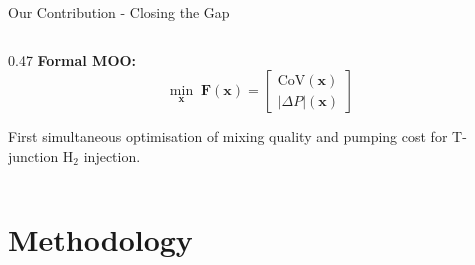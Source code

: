 \documentclass[10pt, aspectratio=169]{beamer}
\begin{document}
\begin{frame}{Our Contribution - Closing the Gap}
\begin{columns}[T]
\begin{column}{0.47\textwidth}
            \vspace{0.5em}
            \textbf{Formal MOO:}
            \[
                \min_{\mathbf{x}} \;
                \mathbf{F}(\mathbf{x}) = \begin{bmatrix}
                    \text{CoV}(\mathbf{x}) \\[4pt]
                    |\Delta P|(\mathbf{x})
                \end{bmatrix}
            \]

            \vspace{0.3em}
            {\small First simultaneous optimisation of mixing
            quality and pumping cost for T-junction H$_2$ injection.}
        \end{column}
    \end{columns}
\end{frame}

\section{Methodology}
\end{document}
